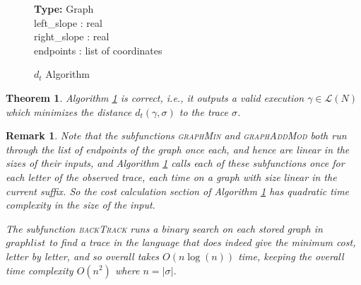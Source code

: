 \documentclass[conference]{IEEEtran}
\makeatletter
\newcommand{\removelatexerror}{\let\@latex@error\@gobble}
\newtheorem{theorem}{Theorem}
\newtheorem{remark}{Remark}
\makeatother
\begin{document}
\begin{figure}
	\removelatexerror
	\begin{algorithm}[H]
		\caption{$d_t$ Algorithm}
		\label{StampAlgo}
		\SetAlgoLined
		\LinesNumbered
		\textbf{Type:} Graph \\
		\Indp
			left\_slope : real \\
			right\_slope : real \\
			endpoints : list of coordinates \\
		\Indm

	\end{algorithm}
\end{figure}

\begin{theorem}\label{StampAlgoCorr}
	Algorithm \ref{StampAlgo} is correct, i.e., it outputs a valid execution
	$\gamma \in \mathcal{L}(N)$ which minimizes the distance $d_t(\gamma, \sigma)$
	to the trace $\sigma$.
\end{theorem}
		
\begin{remark} Note that the subfunctions \textsc{graphMin} and  \textsc{graphAddMod} both run through the list of endpoints of the graph once each, and hence are linear in the sizes of their inputs, and Algorithm \ref{StampAlgo} calls each of these subfunctions once for each letter of the observed trace, each time on a graph with size linear in the current suffix.  
	So the cost calculation section of Algorithm \ref{StampAlgo} has quadratic time complexity in the size of the input. 
	
	The subfunction \textsc{backTrack} runs a binary search on each stored graph in $graphlist$ to find a trace in the language that does indeed give the minimum cost, letter by letter, and so overall takes $O(n \log(n))$ time, keeping the overall time complexity  $O(n^2)$ where $n = |\sigma|$.
\end{remark}
\end{document}
